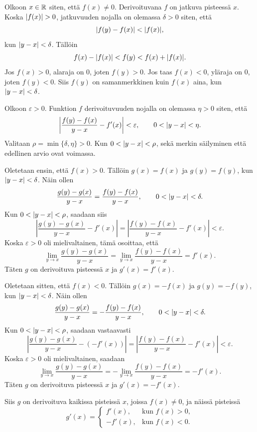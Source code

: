 \documentclass[11pt,a4paper]{amsart}
\begin{document}
\begin{solution}
  Olkoon \(x \in \mathbb{R}\) siten, että \(f(x) \neq 0\).
  Derivoituvana \(f\) on jatkuva pisteessä \(x\). Koska
  \(\lvert f(x)\rvert > 0\), jatkuvuuden nojalla on olemassa \(\delta > 0\)
  siten, että
  \[
    \lvert f(y) - f(x)\rvert < \lvert f(x)\rvert,
  \]
  kun \(\lvert y - x\rvert < \delta\). Tällöin
  \[
    f(x) - \lvert f(x)\rvert < f(y) < f(x) + \lvert f(x)\rvert.
  \]
  Jos \(f(x) > 0\), alaraja on \(0\), joten \(f(y) > 0\). Jos taas
  \(f(x) < 0\), yläraja on \(0\), joten \(f(y) < 0\). Siis \(f(y)\)
  on samanmerkkinen kuin \(f(x)\) aina, kun \(\lvert y - x\rvert < \delta\).

  Olkoon \(\varepsilon > 0\). Funktion \(f\) derivoituvuuden nojalla on
  olemassa \(\eta > 0\) siten, että
  \[
    \left|\frac{f(y) - f(x)}{y - x} - f'(x)\right| < \varepsilon,
    \qquad 0 < \lvert y - x\rvert < \eta.
  \]
  Valitaan \(\rho = \min\{\delta, \eta\} > 0\). Kun
  \(0 < \lvert y - x\rvert < \rho\), sekä merkin säilyminen että edellinen
  arvio ovat voimassa.

  Oletetaan ensin, että \(f(x) > 0\). Tällöin \(g(x) = f(x)\) ja
  \(g(y) = f(y)\), kun \(\lvert y - x\rvert < \delta\). Näin ollen
  \[
    \frac{g(y) - g(x)}{y - x}
    = \frac{f(y) - f(x)}{y - x},
    \qquad 0 < \lvert y - x\rvert < \delta.
  \]
  Kun \(0 < \lvert y - x\rvert < \rho\), saadaan siis
  \[
    \left|\frac{g(y) - g(x)}{y - x} - f'(x)\right|
    = \left|\frac{f(y) - f(x)}{y - x} - f'(x)\right|
    < \varepsilon.
  \]
  Koska \(\varepsilon > 0\) oli mielivaltainen, tämä osoittaa, että
  \[
    \lim_{y \to x} \frac{g(y) - g(x)}{y - x}
    = \lim_{y \to x} \frac{f(y) - f(x)}{y - x}
    = f'(x).
  \]
  Täten \(g\) on derivoituva pisteessä \(x\) ja \(g'(x) = f'(x)\).

  Oletetaan sitten, että \(f(x) < 0\). Tällöin \(g(x) = -f(x)\) ja
  \(g(y) = -f(y)\), kun \(\lvert y - x\rvert < \delta\). Näin ollen
  \[
    \frac{g(y) - g(x)}{y - x} =
    -\frac{f(y) - f(x)}{y - x},
    \qquad 0 < \lvert y - x\rvert < \delta.
  \]
  Kun \(0 < \lvert y - x\rvert < \rho\), saadaan vastaavasti
  \[
    \left|\frac{g(y) - g(x)}{y - x} - (-f'(x))\right|
    = \left|\frac{f(y) - f(x)}{y - x} - f'(x)\right|
    < \varepsilon.
  \]
  Koska \(\varepsilon > 0\) oli mielivaltainen, saadaan
  \[
    \lim_{y \to x} \frac{g(y) - g(x)}{y - x}
    = -\lim_{y \to x} \frac{f(y) - f(x)}{y - x}
    = -f'(x).
  \]
  Täten \(g\) on derivoituva pisteessä \(x\) ja \(g'(x) = -f'(x)\).

  Siis \(g\) on derivoituva kaikissa pisteissä \(x\), joissa
  \(f(x) \neq 0\), ja näissä pisteissä
  \[
    g'(x) =
    \begin{cases}
      f'(x), & \text{kun } f(x) > 0, \\
      -f'(x), & \text{kun } f(x) < 0.
    \end{cases}
  \]
\end{solution}
\end{document}
